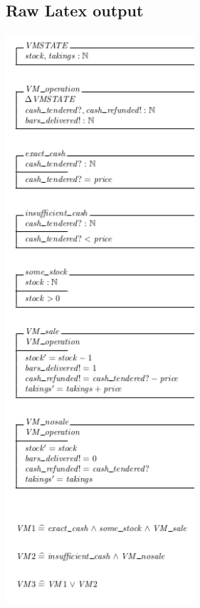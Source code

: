 \begin{multicols}{2}
\subsection{Raw Latex output}
\label{app:vm0o}


\includegraphics[width=7cm]{examples/vm/0o.png}
\end{multicols}

